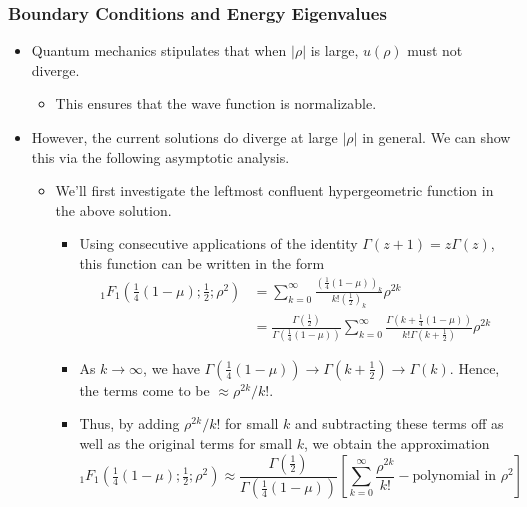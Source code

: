 \documentclass[../finalProject.tex]{subfiles}
\begin{document}
\subsubsection{Boundary Conditions and Energy Eigenvalues}
\begin{itemize}
    \item {}Quantum mechanics stipulates that when $|\rho|$ is large, $u(\rho)$ must not diverge.
    \begin{itemize}
        \item This ensures that the wave function is normalizable.
    \end{itemize}
    \item However, the current solutions do diverge at large $|\rho|$ in general. We can show this via the following asymptotic analysis.
    \begin{itemize}
        \item We'll first investigate the leftmost confluent hypergeometric function in the above solution.
        \begin{itemize}
            \item Using consecutive applications of the identity $\Gamma(z+1)=z\Gamma(z)$, this function can be written in the form
            \begin{align*}
                {}_1F_1(\tfrac{1}{4}(1-\mu);\tfrac{1}{2};\rho^2) &= \sum_{k=0}^\infty\frac{\left( \tfrac{1}{4}(1-\mu) \right)_k}{k!\left( \tfrac{1}{2} \right)_k}\rho^{2k}\\
                &= \frac{\Gamma\left( \tfrac{1}{2} \right)}{\Gamma\left( \tfrac{1}{4}(1-\mu) \right)}\sum_{k=0}^\infty\frac{\Gamma\left( k+\tfrac{1}{4}(1-\mu) \right)}{k!\Gamma\left( k+\tfrac{1}{2} \right)}\rho^{2k}
            \end{align*}
            \item As $k\to\infty$, we have $\Gamma\left( \frac{1}{4}(1-\mu) \right)\to\Gamma\left( k+\frac{1}{2} \right)\to\Gamma(k)$. Hence, the terms come to be $\approx\rho^{2k}/k!$.
            \item Thus, by adding $\rho^{2k}/k!$ for small $k$ and subtracting these terms off as well as the original terms for small $k$, we obtain the approximation
            \begin{equation*}
                {}_1F_1(\tfrac{1}{4}(1-\mu);\tfrac{1}{2};\rho^2) \approx \frac{\Gamma\left( \tfrac{1}{2} \right)}{\Gamma\left( \tfrac{1}{4}(1-\mu) \right)}\left[ \sum_{k=0}^\infty\frac{\rho^{2k}}{k!}-\text{polynomial in }\rho^2 \right]
            \end{equation*}

\end{itemize}
\end{itemize}
\end{itemize}
\end{document}
